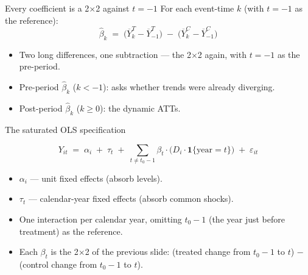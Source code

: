 \documentclass[aspectratio=169,11pt]{beamer}
\begin{document}
\begin{frame}{Every coefficient is a 2$\times$2 against $t = -1$}
\vspace{0.5em}
For each event-time $k$ (with $t = -1$ as the reference):
\vspace{-0.2em}
\[
\hat\beta_k \;=\; \big(\overline{Y}^T_k - \overline{Y}^T_{-1}\big) \;-\; \big(\overline{Y}^C_k - \overline{Y}^C_{-1}\big)
\]
\vspace{0.0em}
\begin{itemize}\setlength\itemsep{4pt}
  \item Two long differences, one subtraction --- the 2$\times$2 again, with $t=-1$ as the pre-period.
  \item Pre-period $\hat\beta_k$ ($k < -1$): asks whether trends were already diverging.
  \item Post-period $\hat\beta_k$ ($k \geq 0$): the dynamic ATTs.
\end{itemize}
\vspace{0.4em}
\end{frame}

\begin{frame}{The saturated OLS specification}
\vspace{0.6em}
\begin{center}
\[
Y_{it} \;=\; \alpha_i \;+\; \tau_t \;+\; \sum_{t \neq t_0 - 1} \beta_t \cdot \big(D_i \cdot \mathbf{1}\{\text{year} = t\}\big) \;+\; \varepsilon_{it}
\]
\end{center}
\vspace{0.6em}
\begin{itemize}\setlength\itemsep{4pt}
  \item $\alpha_i$ --- unit fixed effects (absorb levels).
  \item $\tau_t$ --- calendar-year fixed effects (absorb common shocks).
  \item One interaction per calendar year, omitting $t_0 - 1$ (the year just before treatment) as the reference.
  \item Each $\beta_t$ is the 2$\times$2 of the previous slide: \;(treated change from $t_0{-}1$ to $t$) $-$ (control change from $t_0{-}1$ to $t$).
\end{itemize}
\vspace{0.4em}
\end{frame}
\end{document}
